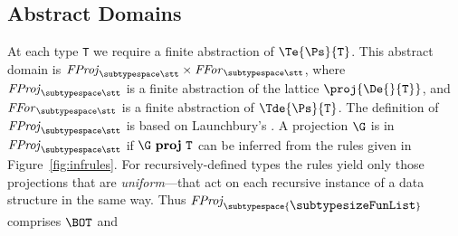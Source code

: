 \begin{article}
\section{Abstract Domains}

At each type \mbox{\tt T} we require a finite abstraction of $\Te{\Ps}{\mbox{\tt T}}$.
This abstract domain is ${\it{}FProj}_{\subtypespace\stt}\times{\it{}FFor}_{\subtypespace\stt}$,
where ${\it{}FProj}_{\subtypespace\stt}$ is a finite abstraction of the lattice
$\proj{\De{}{\mbox{\tt T}}}$, and ${\it{}FFor}_{\subtypespace\stt}$ is a finite abstraction
of $\Tde{\Ps}{\mbox{\tt T}}$.  The definition of ${\it{}FProj}_{\subtypespace\stt}$ is based
on Launchbury's \cite{Lau91a}.  A projection $\G$ is in
${\it{}FProj}_{\subtypespace\stt}$ if $\G~\mbox{\bf proj}~\mbox{\tt T}$ can be inferred from
the rules given in Figure~\ref{fig:infrules}.
%
For recursively-defined types the rules yield only those projections
that are {\it uniform}---that act on each recursive instance of a 
data structure in the same
way.  Thus ${\it{}FProj}_{\subtypespace{\makebox{\subtypesize\tt FunList}} }$ comprises $\BOT$ and

\end{article}
